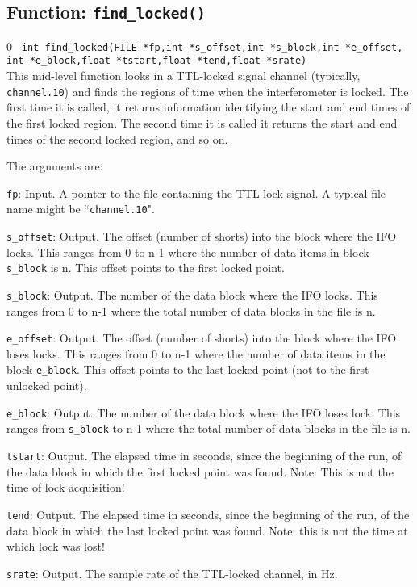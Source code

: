 \clearpage

\subsection{Function: {\tt find\_locked()}}
\setcounter{equation}0
{\tt 
int find\_locked(FILE *fp,int *s\_offset,int *s\_block,int *e\_offset,
int *e\_block,float *tstart,float *tend,float *srate)
}\\
This mid-level function looks in a TTL-locked signal channel
(typically, {\tt channel.10}) and finds the regions of time when the
interferometer is locked.  The first time it is called, it returns
information identifying the start and end times of the first locked
region.  The second time it is called it returns the start and end
times of the second locked region, and so on.

The arguments are:
\begin{description}
\item{\tt fp}: Input.  A pointer to the
  file containing the TTL lock signal.  A typical file name might be ``{\tt channel.10}".
\item{\tt s\_offset}: Output. The offset (number of shorts) into the
  block where the IFO locks.  This ranges from 0 to n-1 where the number
  of data items in block {\tt s\_block} is n.  This offset points to
  the first locked point.
\item{\tt s\_block}: Output. The number of the data block where the
  IFO locks.  This ranges from 0 to n-1 where the total number of data
  blocks in the file is n.
\item{\tt e\_offset}: Output. The offset (number of shorts) into the
  block where the IFO loses locks.  This ranges from 0 to n-1 where the
  number of data items in the block {\tt e\_block}.  This offset points
  to the last locked point (not to the first unlocked point).
\item{\tt e\_block}: Output. The number of the data block where the
  IFO loses lock.  This ranges from {\tt s\_block} to n-1 where the
  total number of data blocks in the file is n.
\item{\tt tstart}: Output. The elapsed time in seconds, since the
  beginning of the run, of the data block in which the first locked
  point was found.  Note:  This is not the time of lock acquisition!
\item{\tt tend}: Output.
  The elapsed time in seconds, since the beginning of the run, of the
  data block in which the last locked point was found.  Note:  this is
  not the time at which lock was lost!
\item{\tt srate}: Output. The sample rate of the TTL-locked channel, in Hz.
\end{description}

